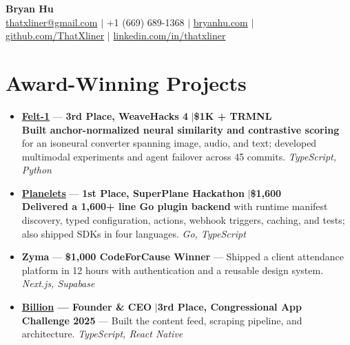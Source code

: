 \documentclass[11pt,letterpaper]{article}
\begin{document}
\begin{center}
  {\LARGE\bfseries Bryan Hu} \\[3pt]
  {\small
  \href{mailto:thatxliner@gmail.com}{thatxliner@gmail.com} \enspace$|$\enspace
  +1 (669) 689-1368 \enspace$|$\enspace
  \href{https://bryanhu.com}{bryanhu.com} \enspace$|$\enspace
  \href{https://github.com/ThatXliner}{github.com/ThatXliner} \enspace$|$\enspace
  \href{https://linkedin.com/in/thatxliner}{linkedin.com/in/thatxliner}
  }
\end{center}

\vspace{1pt}
\noindent\colorbox{accent!8}{}

\section{Award-Winning Projects}
\begin{itemize}[leftmargin=1.35em,nosep,itemsep=3pt]
\item \textbf{\href{https://github.com/EvanZhouDev/felt-1}{Felt-1}} --- \textbf{3rd Place, WeaveHacks 4} \enspace$|$\enspace \textbf{\$1K + TRMNL} \\
\textbf{Built anchor-normalized neural similarity and contrastive scoring} for an isoneural converter spanning image, audio, and text; developed multimodal experiments and agent failover across 45 commits. \textit{TypeScript, Python}

\item \textbf{\href{https://github.com/superplanehq/superplane/pull/5094}{Planelets}} --- \textbf{1st Place, SuperPlane Hackathon} \enspace$|$\enspace \textbf{\$1,600} \\
\textbf{Delivered a 1,600+ line Go plugin backend} with runtime manifest discovery, typed configuration, actions, webhook triggers, caching, and tests; also shipped SDKs in four languages. \textit{Go, TypeScript}

\item \textbf{Zyma} --- \textbf{\$1,000 CodeForCause Winner} --- Shipped a client attendance platform in 12 hours with authentication and a reusable design system. \textit{Next.js, Supabase}
\item \textbf{\href{https://github.com/billion-app/billion}{Billion} --- Founder \& CEO} \enspace$|$\enspace \textbf{3rd Place, Congressional App Challenge 2025} --- Built the content feed, scraping pipeline, and architecture. \textit{TypeScript, React Native}
\end{itemize}
\end{document}
